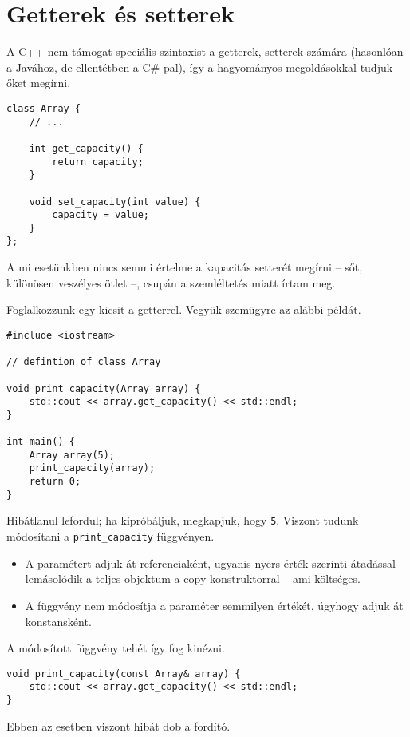 \documentclass[a4paper, 11pt, oneside]{book}
\begin{document}
\section{Getterek és setterek}

A C++ nem támogat speciális szintaxist a getterek, setterek számára (hasonlóan a Javához, de ellentétben a C\#-pal), így a hagyományos megoldásokkal tudjuk őket megírni.

\begin{lstlisting}[style=cppstyle]
class Array {
	// ...
	
	int get_capacity() { 
		return capacity; 
	}
	
	void set_capacity(int value) {
		capacity = value;
	}
};
\end{lstlisting}

A mi esetünkben nincs semmi értelme a kapacitás setterét megírni -- sőt, különösen veszélyes ötlet --, csupán a szemléltetés miatt írtam meg.

Foglalkozzunk egy kicsit a getterrel. Vegyük szemügyre az alábbi példát.

\begin{lstlisting}[style=cppstyle]
#include <iostream>

// defintion of class Array

void print_capacity(Array array) {
	std::cout << array.get_capacity() << std::endl;
}

int main() {
	Array array(5);
	print_capacity(array);
	return 0;
}
\end{lstlisting}

Hibátlanul lefordul; ha kipróbáljuk, megkapjuk, hogy \verb*|5|. Viszont tudunk módosítani a \verb*|print_capacity| függvényen.
\begin{itemize}
	\item A paramétert adjuk át referenciaként, ugyanis nyers érték szerinti átadással lemásolódik a teljes objektum a copy konstruktorral -- ami költséges.
	\item A függvény nem módosítja a paraméter semmilyen értékét, úgyhogy adjuk át konstansként.
\end{itemize}

A módosított függvény tehét így fog kinézni.

\begin{lstlisting}[style=cppstyle]	
void print_capacity(const Array& array) {
	std::cout << array.get_capacity() << std::endl;
}
\end{lstlisting}

Ebben az esetben viszont hibát dob a fordító.
\end{document}
